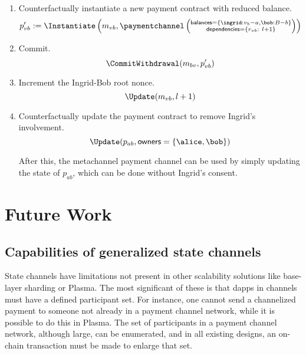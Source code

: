 \documentclass[prb,floatfix,reprint,nofootinbib,amsmath,amssymb,epsfig,pre,floats,letterpaper,groupedaffiliation,tightenlines,allcolors=blue,11pt]{revtex4}
\theoremstyle{definition}
\theoremstyle{definition}
\theoremstyle{definition}
\begin{document}
\begin{enumerate}
\item Counterfactually instantiate a new payment contract with reduced balance.
\[
    p'_{vb} := \Instantiate\left(m_{vb},
        \paymentchannel\left(\substack{
        \textsf{balances}=\{\ingrid: v_b - a, \bob: B - b\} \\
        \textsf{dependencies}=\left\{r_{vb}:\ l+1\right\}
        }\right)
        \right)
\]


\item Commit.
\[
    \CommitWithdrawal(m_{bv}, p'_{vb})
\]

\item Increment the Ingrid-Bob root nonce.
\[
    \Update(m_{vb}, l+1)
\]

\item Counterfactually update the payment contract to remove Ingrid's involvement.
\[
    \Update(p_{ab}, \textsf{owners}=\{\alice, \bob\})
\]

After this, the metachannel payment channel can be used by simply updating the state of $p_{ab}$, which can be done without Ingrid's consent.

\end{enumerate}

\section{Future Work}

\subsection{Capabilities of generalized state channels}

State channels have limitations not present in other scalability solutions like base-layer sharding or Plasma. The most significant of these is that dapps in channels must have a defined participant set. For instance, one cannot send a channelized payment to someone not already in a payment channel network, while it is possible to do this in Plasma. The set of participants in a payment channel network, although large, can be enumerated, and in all existing designs, an on-chain transaction must be made to enlarge that set.
\end{document}
